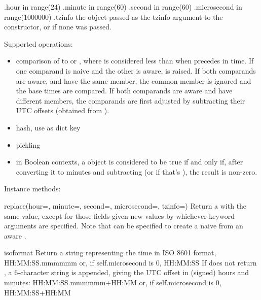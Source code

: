     .hour           in range(24)
    .minute         in range(60)
    .second         in range(60)
    .microsecond    in range(1000000)
    .tzinfo         the object passed as the tzinfo argument to the
                     constructor, or  if none
                    was passed.

Supported operations:

\begin{itemize}
  \item
    comparison of  to  or ,
    where  is considered less than  when  precedes
     in time.  If one comparand is naive and the other is aware,
     is raised.  If both comparands are aware, and
    have the same  member, the common 
    member is ignored and the base times are compared.  If both
    comparands are aware and have different  members,
    the comparands are first adjusted by subtracting their UTC offsets
    (obtained from ).

  \item
    hash, use as dict key

  \item
    pickling

  \item
    in Boolean contexts, a  object is considered to be
    true if and only if, after converting it to minutes and
    subtracting  (or  if that's
    ), the result is non-zero.
\end{itemize}

Instance methods:

\begin{methoddesc}{replace}(hour=, minute=, second=, microsecond=, tzinfo=)
    Return a  with the same value, except for those fields given
    new values by whichever keyword arguments are specified.  Note that
     can be specified to create a naive  from an
    aware .
\end{methoddesc}

\begin{methoddesc}{isoformat}{}
    Return a string representing the time in ISO 8601 format,
        HH:MM:SS.mmmmmm
    or, if self.microsecond is 0,
        HH:MM:SS
    If  does not return , a 6-character
    string is appended, giving the UTC offset in (signed) hours and
    minutes:
        HH:MM:SS.mmmmmm+HH:MM
    or, if self.microsecond is 0,
        HH:MM:SS+HH:MM
\end{methoddesc}

